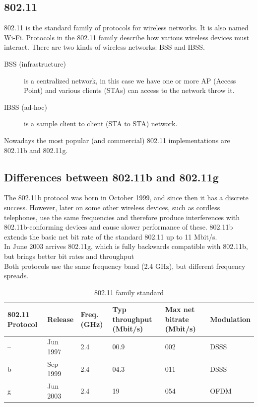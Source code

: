 	\subsection{802.11} \label{theory:prot_specs}
	802.11 is the standard family of protocols for wireless networks. It is also named Wi-Fi. Protocols in the 802.11 family describe how various wireless devices must interact. There are two kinds of wireless networks: BSS and IBSS.
	\begin{description}
		\item[BSS (infrastructure)] is a centralized network, in this case we have one or more AP (Access Point) and various clients (STAs) can access to the network throw it.
		\item[IBSS (ad-hoc)] is a sample client to client (STA to STA) network.
	\end{description}
	Nowadays the most popular (and commercial) 802.11 implementations are 802.11b and 802.11g.
	
	\subsection{Differences between 802.11b and 802.11g} \label{theory:prot_differences}
	
	The 802.11b protocol was born in October 1999, and since then it has a discrete success.  However, later on some other wireless devices, such as cordless telephones, use the same frequencies and therefore produce interferences with 802.11b-conforming devices and cause slower performance of these.
	802.11b extends the basic net bit rate of the standard 802.11 up to 11 Mbit/s.\\
	
	In June 2003 arrives 802.11g, which is fully backwards compatible with 802.11b, but brings better bit rates and throughput\\
	
	Both protocols use the same frequency band (2.4 GHz), but different frequency spreads.
	
	\begin{table}[h]
		
		\begin{tabularx}{15cm}{ | X X X X X X | }
			\hline
				802.11 Protocol & Release & Freq. (GHz) & Typ throughput (Mbit/s) & Max net bitrate (Mbit/s) & Modulation \\
			\hline
				-- & Jun 1997 & 2.4 & 00.9 & 002 & DSSS \\
				b & Sep 1999 & 2.4 & 04.3 & 011 & DSSS \\
				g & Jun 2003 & 2.4 & 19 & 054 & OFDM \\
			\hline
		\end{tabularx}
		
		\caption{802.11 family standard}
		\label{802.11_family_standard}
	\end{table}
	
